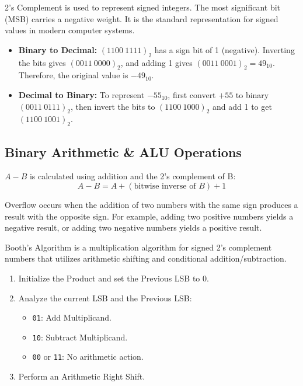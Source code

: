 \begin{remark}
2's Complement is used to represent signed integers. The most significant bit (MSB) carries a negative weight. It is the standard representation for signed values in modern computer systems.
\end{remark}

\begin{example}
\begin{itemize}
    \item \textbf{Binary to Decimal:} $(1100\ 1111)_2$ has a sign bit of 1 (negative). Inverting the bits gives $(0011\ 0000)_2$, and adding 1 gives $(0011\ 0001)_2 = 49_{10}$. Therefore, the original value is $-49_{10}$.
    \item \textbf{Decimal to Binary:} To represent $-55_{10}$, first convert $+55$ to binary $(0011\ 0111)_2$, then invert the bits to $(1100\ 1000)_2$ and add 1 to get $(1100\ 1001)_2$.
\end{itemize}
\end{example}

\subsection{Binary Arithmetic \& ALU Operations}

\begin{remark}
$A - B$ is calculated using addition and the 2's complement of B:
\begin{equation}
A - B = A + (\text{bitwise inverse of } B) + 1
\end{equation}
\end{remark}

\begin{remark}
Overflow occurs when the addition of two numbers with the same sign produces a result with the opposite sign. For example, adding two positive numbers yields a negative result, or adding two negative numbers yields a positive result.
\end{remark}

\begin{remark}
Booth's Algorithm is a multiplication algorithm for signed 2's complement numbers that utilizes arithmetic shifting and conditional addition/subtraction.
\begin{enumerate}
    \item Initialize the Product and set the Previous LSB to 0.
    \item Analyze the current LSB and the Previous LSB:
    \begin{itemize}
        \item \texttt{01}: Add Multiplicand.
        \item \texttt{10}: Subtract Multiplicand.
        \item \texttt{00} or \texttt{11}: No arithmetic action.
    \end{itemize}
    \item Perform an Arithmetic Right Shift.
\end{enumerate}
\end{remark}

